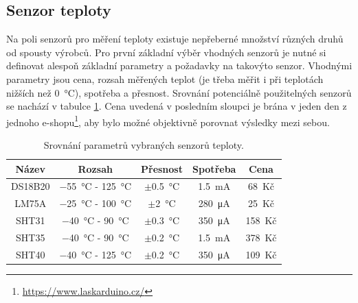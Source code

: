\subsection{Senzor teploty}

Na poli senzorů pro měření teploty existuje nepřeberné množství různých druhů od spousty výrobců. Pro první základní výběr vhodných senzorů je nutné si definovat alespoň základní parametry a požadavky na takovýto senzor. Vhodnými parametry jsou cena, rozsah měřených teplot (je třeba měřit i při teplotách nižších než \SI{0}{\celsius}), spotřeba a přesnost. Srovnání potenciálně použitelných senzorů se nachází v tabulce \ref{tab_TemperatureSensors}. Cena uvedená v posledním sloupci je brána v jeden den z jednoho e-shopu\footnote{\url{https://www.laskarduino.cz/}}, aby bylo možné objektivně porovnat výsledky mezi sebou.

\begin{table}[]
    \centering
    \begin{tabular}{c|cccc}
    \textbf{Název} & \textbf{Rozsah}                         & \textbf{Přesnost}       & \textbf{Spotřeba}       & \textbf{Cena} \\ \hline
    DS18B20        & \SI{-55}{\celsius} - \SI{125}{\celsius} & $\pm$\SI{0,5}{\celsius} & \SI{1,5}{\milli\ampere} & 68~Kč         \\
    LM75A          & \SI{-25}{\celsius} - \SI{100}{\celsius} & $\pm$\SI{2}{\celsius}   & \SI{280}{\micro\ampere} & 25~Kč         \\
    SHT31          & \SI{-40}{\celsius} - \SI{90}{\celsius}  & $\pm$\SI{0,3}{\celsius} & \SI{350}{\micro\ampere} & 158~Kč        \\
    SHT35          & \SI{-40}{\celsius} - \SI{90}{\celsius}  & $\pm$\SI{0,2}{\celsius} & \SI{1,5}{\milli\ampere} & 378~Kč        \\
    SHT40          & \SI{-40}{\celsius} - \SI{125}{\celsius} & $\pm$\SI{0,2}{\celsius} & \SI{350}{\micro\ampere} & 109~Kč             
    \end{tabular}
    \caption{Srovnání parametrů vybraných senzorů teploty.}
    \label{tab_TemperatureSensors}
\end{table}

